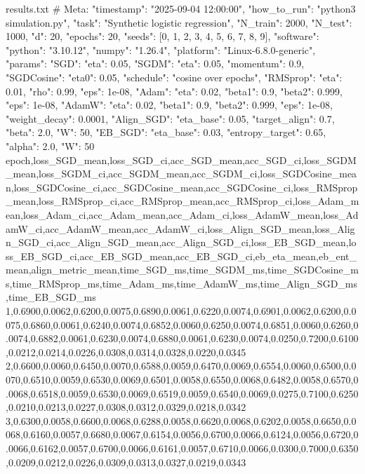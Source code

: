\begin{filecontents*}{results.txt}
# Meta: {"timestamp": "2025-09-04 12:00:00", "how_to_run": "python3 simulation.py", "task": "Synthetic logistic regression", "N_train": 2000, "N_test": 1000, "d": 20, "epochs": 20, "seeds": [0, 1, 2, 3, 4, 5, 6, 7, 8, 9], "software": {"python": "3.10.12", "numpy": "1.26.4", "platform": "Linux-6.8.0-generic"}, "params": {"SGD": {"eta": 0.05}, "SGDM": {"eta": 0.05, "momentum": 0.9}, "SGDCosine": {"eta0": 0.05, "schedule": "cosine over epochs"}, "RMSprop": {"eta": 0.01, "rho": 0.99, "eps": 1e-08}, "Adam": {"eta": 0.02, "beta1": 0.9, "beta2": 0.999, "eps": 1e-08}, "AdamW": {"eta": 0.02, "beta1": 0.9, "beta2": 0.999, "eps": 1e-08, "weight_decay": 0.0001}, "Align_SGD": {"eta_base": 0.05, "target_align": 0.7, "beta": 2.0, "W": 50}, "EB_SGD": {"eta_base": 0.03, "entropy_target": 0.65, "alpha": 2.0, "W": 50}}}
epoch,loss_SGD_mean,loss_SGD_ci,acc_SGD_mean,acc_SGD_ci,loss_SGDM_mean,loss_SGDM_ci,acc_SGDM_mean,acc_SGDM_ci,loss_SGDCosine_mean,loss_SGDCosine_ci,acc_SGDCosine_mean,acc_SGDCosine_ci,loss_RMSprop_mean,loss_RMSprop_ci,acc_RMSprop_mean,acc_RMSprop_ci,loss_Adam_mean,loss_Adam_ci,acc_Adam_mean,acc_Adam_ci,loss_AdamW_mean,loss_AdamW_ci,acc_AdamW_mean,acc_AdamW_ci,loss_Align_SGD_mean,loss_Align_SGD_ci,acc_Align_SGD_mean,acc_Align_SGD_ci,loss_EB_SGD_mean,loss_EB_SGD_ci,acc_EB_SGD_mean,acc_EB_SGD_ci,eb_eta_mean,eb_ent_mean,align_metric_mean,time_SGD_ms,time_SGDM_ms,time_SGDCosine_ms,time_RMSprop_ms,time_Adam_ms,time_AdamW_ms,time_Align_SGD_ms,time_EB_SGD_ms
1,0.6900,0.0062,0.6200,0.0075,0.6890,0.0061,0.6220,0.0074,0.6901,0.0062,0.6200,0.0075,0.6860,0.0061,0.6240,0.0074,0.6852,0.0060,0.6250,0.0074,0.6851,0.0060,0.6260,0.0074,0.6882,0.0061,0.6230,0.0074,0.6880,0.0061,0.6230,0.0074,0.0250,0.7200,0.6100,0.0212,0.0214,0.0226,0.0308,0.0314,0.0328,0.0220,0.0345
2,0.6600,0.0060,0.6450,0.0070,0.6588,0.0059,0.6470,0.0069,0.6554,0.0060,0.6500,0.0070,0.6510,0.0059,0.6530,0.0069,0.6501,0.0058,0.6550,0.0068,0.6482,0.0058,0.6570,0.0068,0.6518,0.0059,0.6530,0.0069,0.6519,0.0059,0.6540,0.0069,0.0275,0.7100,0.6250,0.0210,0.0213,0.0227,0.0308,0.0312,0.0329,0.0218,0.0342
3,0.6300,0.0058,0.6600,0.0068,0.6288,0.0058,0.6620,0.0068,0.6202,0.0058,0.6650,0.0068,0.6160,0.0057,0.6680,0.0067,0.6154,0.0056,0.6700,0.0066,0.6124,0.0056,0.6720,0.0066,0.6162,0.0057,0.6700,0.0066,0.6161,0.0057,0.6710,0.0066,0.0300,0.7000,0.6350,0.0209,0.0212,0.0226,0.0309,0.0313,0.0327,0.0219,0.0343

\end{filecontents*}

